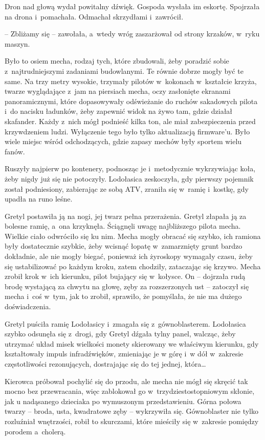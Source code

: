 \documentclass[oneside,polish,11pt,sfheadings]{mwbk}
\begin{document}
Dron nad głową wydał powitalny dźwięk. Gospoda wysłała im eskortę.
Spojrzała na drona i~pomachała. Odmachał skrzydłami i~zawrócił.

-- Zbliżamy się -- zawołała, a~wtedy wróg zaszarżował od strony krzaków, w~ryku maszyn.

Było to osiem mecha, rodzaj tych, które zbudowali, żeby poradzić sobie z~najtrudniejszymi zadaniami budowlanymi. Te równie dobrze mogły być te
same. Na trzy metry wysokie, trzymały pilotów w~kokonach w~kształcie
krzyża, twarze wyglądające z~jam na piersiach mecha, oczy zasłonięte
ekranami panoramicznymi, które dopasowywały odświeżanie do ruchów
sakadowych pilota i~do nacisku ładunków, żeby zapewnić widok na żywo
tam, gdzie działał skafander. Każdy z~nich mógł podnieść kilka ton, ale
miał zabezpieczenia przed krzywdzeniem ludzi. Wyłączenie tego było tylko
aktualizacją firmware'u. Było wiele miejsc wśród odchodzących, gdzie
zapasy mechów były sportem wielu fanów.

Ruszyły najpierw po kontenery, podnosząc je i~metodycznie wykrzywiając
koła, żeby nigdy już się nie potoczyły. Lodołasica zeskoczyła, gdy
pierwszy pojemnik został podniesiony, zabierając ze sobą ATV, zraniła
się w~ramię i~kostkę, gdy upadła na runo leśne.

Gretyl postawiła ją na nogi, jej twarz pełna przerażenia. Gretyl złapała
ją za bolesne ramię, a~ona krzyknęła. Ściągnęli uwagę najbliższego
pilota mecha. Wielkie ciało odwróciło się ku nim. Mecha mogły obracać
się szybko, ich ramiona były dostatecznie szybkie, żeby wcisnąć łopatę w~zamarznięty grunt bardzo dokładnie, ale nie mogły biegać, ponieważ ich
żyroskopy wymagały czasu, żeby się ustabilizować po każdym kroku, zatem
chodziły, zataczając się krzywo. Mecha zrobił krok w~ich kierunku, pilot
bujający się w~kołysce. On -- dojrzała rudą brodę wystającą za chwytu na
głowę, zęby za rozszerzonych ust -- zatoczył się mecha i~coś w~tym, jak
to zrobił, sprawiło, że pomyślała, że nie ma dużego doświadczenia.

Gretyl puściła ramię Lodołasicy i~zmagała się z~gównoblasterem.
Lodołasica szybko odsunęła się z~drogi, gdy Gretyl dźgała tylny panel,
walcząc, żeby utrzymać układ misek wielkości monety skierowany we
właściwym kierunku, gdy kształtowały impuls infradźwięków, zmieniając je
w górę i~w dół w~zakresie częstotliwości rezonujących, dostrajając się
do tej jednej, która\ldots 

Kierowca próbował pochylić się do przodu, ale mecha nie mógł się skręcić
tak mocno bez przewracania, więc zablokował go w~trzydziestostopniowym
skłonie, jak u nadąsanego dzieciaka po wymuszonym przedstawieniu. Górna
połowa twarzy -- broda, usta, kwadratowe zęby -- wykrzywiła się.
Gównoblaster nie tylko rozluźniał wnętrzości, robił to skurczami, które
mieściły się w~zakresie pomiędzy porodem a~cholerą.
\end{document}
